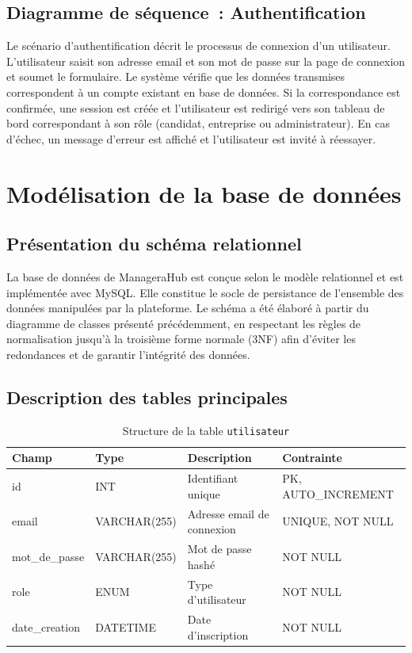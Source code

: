 \documentclass[12pt,a4paper]{report}
\begin{document}
\subsection{Diagramme de séquence~: Authentification}

Le scénario d'authentification décrit le processus de connexion d'un utilisateur. L'utilisateur saisit son adresse email et son mot de passe sur la page de connexion et soumet le formulaire. Le système vérifie que les données transmises correspondent à un compte existant en base de données. Si la correspondance est confirmée, une session est créée et l'utilisateur est redirigé vers son tableau de bord correspondant à son rôle (candidat, entreprise ou administrateur). En cas d'échec, un message d'erreur est affiché et l'utilisateur est invité à réessayer.

\section{Modélisation de la base de données}

\subsection{Présentation du schéma relationnel}

La base de données de ManageraHub est conçue selon le modèle relationnel et est implémentée avec MySQL. Elle constitue le socle de persistance de l'ensemble des données manipulées par la plateforme. Le schéma a été élaboré à partir du diagramme de classes présenté précédemment, en respectant les règles de normalisation jusqu'à la troisième forme normale (3NF) afin d'éviter les redondances et de garantir l'intégrité des données.

\subsection{Description des tables principales}

\begin{table}[H]
\centering
\caption{Structure de la table \texttt{utilisateur}}
\begin{tabularx}{\textwidth}{llXl}
\toprule
\textbf{Champ} & \textbf{Type} & \textbf{Description} & \textbf{Contrainte} \\
\midrule
id & INT & Identifiant unique & PK, AUTO\_INCREMENT \\
email & VARCHAR(255) & Adresse email de connexion & UNIQUE, NOT NULL \\
mot\_de\_passe & VARCHAR(255) & Mot de passe hashé & NOT NULL \\
role & ENUM & Type d'utilisateur & NOT NULL \\
date\_creation & DATETIME & Date d'inscription & NOT NULL \\
\bottomrule
\end{tabularx}
\end{table}
\end{document}
